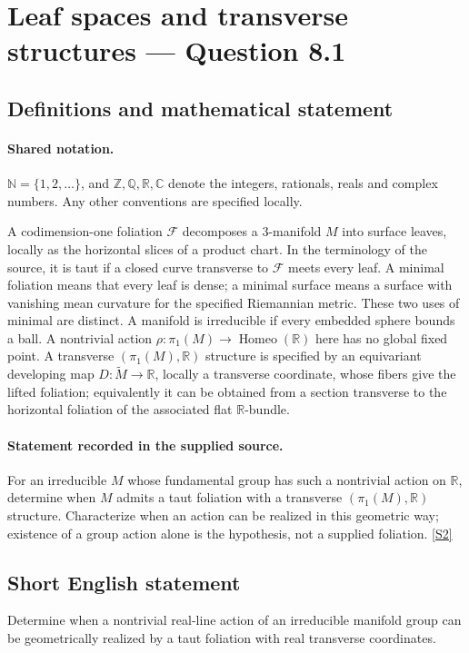 \documentclass[11pt]{article}
\newcommand{\sref}[2]{\hyperlink{source:#1:#2}{[S#2]}}
\begin{document}
\section{Leaf spaces and transverse structures — Question 8.1}\label{statement}

\subsection{Definitions and mathematical statement}

\paragraph{Shared notation.}$\mathbb N=\{1,2,\ldots\}$, and $\mathbb Z,\mathbb Q,\mathbb R,\mathbb C$ denote the integers, rationals, reals and complex numbers. Any other conventions are specified locally.


A codimension-one foliation $\mathcal F$ decomposes a $3$-manifold $M$ into surface leaves, locally as the horizontal slices of a product chart. In the terminology of the source, it is taut if a closed curve transverse to $\mathcal F$ meets every leaf. A minimal foliation means that every leaf is dense; a minimal surface means a surface with vanishing mean curvature for the specified Riemannian metric. These two uses of minimal are distinct. A manifold is irreducible if every embedded sphere bounds a ball. A nontrivial action $\rho:\pi_1(M)\to\operatorname{Homeo}(\mathbb R)$ here has no global fixed point. A transverse $(\pi_1(M),\mathbb R)$ structure is specified by an equivariant developing map $D:\widetilde M\to\mathbb R$, locally a transverse coordinate, whose fibers give the lifted foliation; equivalently it can be obtained from a section transverse to the horizontal foliation of the associated flat $\mathbb R$-bundle.
\paragraph{Statement recorded in the supplied source.}
For an irreducible $M$ whose fundamental group has such a nontrivial action on $\mathbb R$, determine when $M$ admits a taut foliation with a transverse $(\pi_1(M),\mathbb R)$ structure. Characterize when an action can be realized in this geometric way; existence of a group action alone is the hypothesis, not a supplied foliation. \sref{statement}{2}
\subsection{Short English statement}
Determine when a nontrivial real-line action of an irreducible manifold group can be geometrically realized by a taut foliation with real transverse coordinates.
\end{document}
